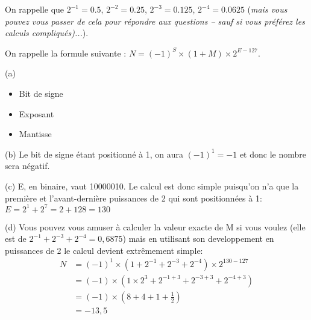 \documentclass[11pt,a4paper]{exam}
\begin{document}
\begin{questions}
\begin{spacing}{1}
		On rappelle que $2^{-1} = 0.5$, $2^{-2} = 0.25$, $2^{-3} = 0.125$, $2^{-4} = 0.0625$ (\textit{mais vous pouvez vous passer de cela pour répondre aux questions -- sauf si vous préférez les calculs compliqués)...}).
		
		On rappelle la formule suivante : $N = (-1)^S \times (1 + M) \times 2^{E - 127}$.
		
		\begin{solution}
			
			(a) \begin{itemize}
				\item Bit de signe
				\item Exposant
				\item Mantisse
			\end{itemize}
			
			(b) Le bit de signe étant positionné à 1, on aura $(-1)^1 = -1$ et donc le nombre sera négatif.
			
			(c) E, en binaire, vaut 10000010. Le calcul est donc simple puisqu'on n'a que la première et l'avant-dernière puissances de 2 qui sont positionnées à 1: $E = 2^1 + 2^7 = 2 + 128 = 130$
			
			(d) Vous pouvez vous amuser à calculer la valeur exacte de M si vous voulez (elle est de $2^{-1} + 2^{-3} + 2^{-4} = 0,6875$) mais en utilisant son developpement en puissances de 2 le calcul devient extrêmement simple:
			\begin{align*}
				N &= (-1)^1 \times (1 + 2^{-1} + 2^{-3} + 2^{-4}) \times 2^{130 - 127}\\
				&= (-1) \times (1 \times 2^3 + 2^{-1 + 3} + 2^{-3 + 3} + 2^{-4 + 3}) \\
				&= (-1) \times (8 + 4 + 1 + \frac{1}{2}) \\
				&= -13,5
			\end{align*}
		\end{solution} 
            

\end{spacing}
\end{questions}
\end{document}
